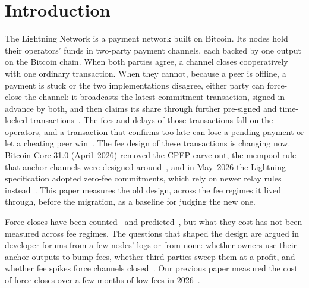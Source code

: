 \section{Introduction}
\label{sec:intro}

The Lightning Network is a payment network built on Bitcoin. Its nodes hold their operators' funds in two-party
payment channels, each backed by one output on the Bitcoin chain. When both parties agree, a channel closes
cooperatively with one ordinary transaction. When they cannot, because a peer is offline, a payment is stuck or the two
implementations disagree, either party can force-close the channel: it broadcasts the latest commitment transaction,
signed in advance by both, and then claims its share through further pre-signed and time-locked
transactions~\cite{poon2016bitcoin,bolt3,bolt5}. The fees and delays of those transactions fall on the operators, and
a transaction that confirms too late can lose a pending payment or let a cheating peer
win~\cite{harris2020flood,riard2020timedilation,riard2023replacement}. The fee design of these transactions is
changing now. Bitcoin Core 31.0 (April~2026) removed the CPFP carve-out, the mempool rule that anchor channels were
designed around~\cite{core31}, and in May~2026 the Lightning specification adopted zero-fee commitments, which rely on
newer relay rules instead~\cite{bolts1228zerofee,bip431,core28}. This paper measures the old design, across the fee
regimes it lived through, before the migration, as a baseline for judging the new one.

Force closes have been counted~\cite{bitmex2020closures,zabka2022empirical,grotschla2025lifecycle} and
predicted~\cite{antonelli2026closures}, but what they cost has not been measured across fee regimes. The questions
that shaped the design are argued in developer forums from a few nodes' logs or from none: whether owners use their
anchor outputs to bump fees, whether third parties sweep them at a profit, and whether fee spikes force channels
closed~\cite{daftuar2024v3,lnd8997}. Our previous paper measured the cost of force closes over a few months of low
fees in 2026~\cite{kumar2026clientdiversity}.

